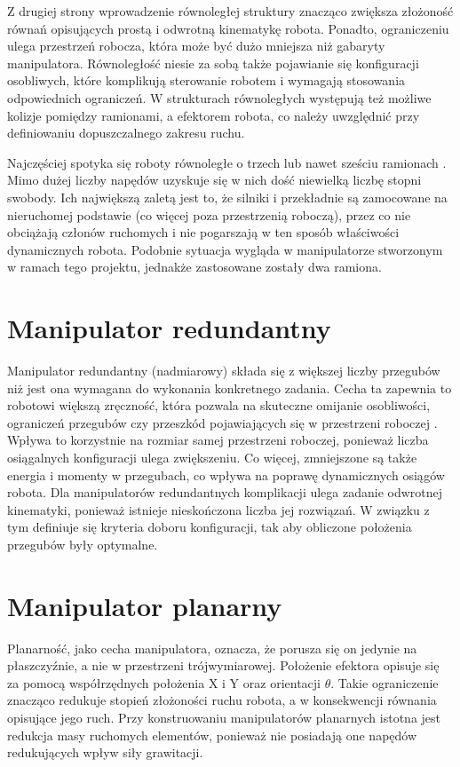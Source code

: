 \documentclass[printmode]{mgr}
\begin{document}
Z drugiej strony wprowadzenie równoległej struktury znacząco zwiększa złożoność równań opisujących prostą i odwrotną kinematykę robota.
Ponadto, ograniczeniu ulega przestrzeń robocza, która może być dużo mniejsza niż gabaryty manipulatora. Równoległość niesie za sobą
także pojawianie się konfiguracji osobliwych, które komplikują sterowanie robotem i wymagają stosowania odpowiednich ograniczeń.
W strukturach równoległych występują też możliwe kolizje pomiędzy ramionami, a efektorem robota, co należy uwzględnić przy
definiowaniu dopuszczalnego zakresu ruchu.

Najczęściej spotyka się roboty równoległe o trzech lub nawet sześciu ramionach \cite{honczarenko}. Mimo dużej liczby napędów uzyskuje
się w nich dość niewielką liczbę stopni swobody. Ich największą zaletą jest to, że silniki i przekładnie są zamocowane
na nieruchomej podstawie (co więcej poza przestrzenią roboczą), przez co nie obciążają członów ruchomych i nie pogarszają w ten sposób
właściwości dynamicznych robota. Podobnie sytuacja wygląda w manipulatorze stworzonym w ramach tego projektu, jednakże zastosowane
zostały dwa ramiona.

\section{Manipulator redundantny} \label{sec:redundantny}
Manipulator redundantny (nadmiarowy) składa się z większej liczby przegubów niż jest ona wymagana do wykonania konkretnego zadania. 
Cecha ta zapewnia to robotowi większą zręczność, która pozwala na skuteczne omijanie osobliwości, ograniczeń przegubów czy
przeszkód pojawiających się w przestrzeni roboczej \cite{handbook}. Wpływa to korzystnie na rozmiar samej przestrzeni roboczej,
ponieważ liczba osiągalnych konfiguracji ulega zwiększeniu. Co więcej, zmniejszone są także energia i momenty w przegubach,
co wpływa na poprawę dynamicznych osiągów robota. Dla manipulatorów redundantnych komplikacji ulega zadanie odwrotnej kinematyki, ponieważ istnieje nieskończona liczba jej rozwiązań. W związku z tym definiuje się kryteria doboru konfiguracji, tak aby obliczone położenia przegubów były optymalne. 


\section{Manipulator planarny}
Planarność, jako cecha manipulatora, oznacza, że porusza się on jedynie na płaszczyźnie, a nie w przestrzeni trójwymiarowej.
Położenie efektora opisuje się za pomocą współrzędnych położenia X i Y oraz orientacji $\theta$. Takie ograniczenie znacząco redukuje 
stopień złożoności ruchu robota, a w konsekwencji równania opisujące jego ruch. Przy konstruowaniu manipulatorów
planarnych istotna jest redukcja masy ruchomych elementów, ponieważ nie posiadają one napędów redukujących wpływ siły grawitacji.
\end{document}

